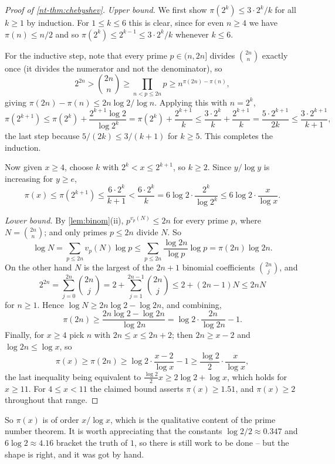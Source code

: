 \documentclass[a4paper]{scrartcl}
\begin{document}
\begin{proof}[Proof of \autoref{nt-thm:chebyshev}]
	\emph{Upper bound.} We first show $\pi(2^k) \leq 3 \cdot 2^k/k$ for all $k \geq 1$ by induction. For $1 \leq k \leq 6$ this is clear, since for even $n \geq 4$ we have $\pi(n) \leq n/2$ and so $\pi(2^k) \leq 2^{k-1} \leq 3\cdot2^k/k$ whenever $k \leq 6$.

	For the inductive step, note that every prime $p \in (n, 2n]$ divides $\binom{2n}n$ exactly once (it divides the numerator and not the denominator), so
	$$
	2^{2n} > \binom{2n}n \geq \prod_{n < p \leq 2n}p \geq n^{\pi(2n) - \pi(n)},
	$$
	giving $\pi(2n) - \pi(n) \leq 2n\log 2/\log n$. Applying this with $n = 2^k$,
	$$
	\pi(2^{k+1}) \leq \pi(2^k) + \frac{2^{k+1}\log 2}{\log 2^k} = \pi(2^k) + \frac{2^{k+1}}k \leq \frac{3\cdot2^k}k + \frac{2^{k+1}}k = \frac{5\cdot 2^{k+1}}{2k} \leq \frac{3\cdot2^{k+1}}{k+1},
	$$
	the last step because $5/(2k) \leq 3/(k+1)$ for $k \geq 5$. This completes the induction.

	Now given $x \geq 4$, choose $k$ with $2^k < x \leq 2^{k+1}$, so $k \geq 2$. Since $y/\log y$ is increasing for $y \geq e$,
	$$
	\pi(x) \leq \pi(2^{k+1}) \leq \frac{6 \cdot 2^k}{k+1} < \frac{6\cdot 2^k}{k} = 6\log 2\cdot\frac{2^k}{\log 2^k} \leq 6\log 2\cdot\frac{x}{\log x}.
	$$

	\emph{Lower bound.} By \autoref{lem:binom}(ii), $p^{v_p(N)} \leq 2n$ for every prime $p$, where $N = \binom{2n}n$; and only primes $p \leq 2n$ divide $N$. So
	$$
	\log N = \sum_{p \leq 2n}v_p(N)\log p \leq \sum_{p \leq 2n}\frac{\log 2n}{\log p}\log p = \pi(2n)\log 2n.
	$$
	On the other hand $N$ is the largest of the $2n+1$ binomial coefficients $\binom{2n}j$, and
	$$
	2^{2n} = \sum_{j=0}^{2n}\binom{2n}j = 2 + \sum_{j=1}^{2n-1}\binom{2n}j \leq 2 + (2n-1)N \leq 2nN
	$$
	for $n \geq 1$. Hence $\log N \geq 2n\log 2 - \log 2n$, and combining,
	$$
	\pi(2n) \geq \frac{2n\log 2 - \log 2n}{\log 2n} = \log 2\cdot\frac{2n}{\log 2n} - 1.
	$$
	Finally, for $x \geq 4$ pick $n$ with $2n \leq x \leq 2n+2$; then $2n \geq x - 2$ and $\log 2n \leq \log x$, so
	$$
	\pi(x) \geq \pi(2n) \geq \log 2\cdot\frac{x-2}{\log x} - 1 \geq \frac{\log 2}2\cdot\frac x{\log x},
	$$
	the last inequality being equivalent to $\frac{\log 2}2 x \geq 2\log 2 + \log x$, which holds for $x \geq 11$. For $4 \leq x < 11$ the claimed bound asserts $\pi(x) \geq 1.51$, and $\pi(x) \geq 2$ throughout that range.
\end{proof}

So $\pi(x)$ is of order $x/\log x$, which is the qualitative content of the prime number theorem. It is worth appreciating that the constants $\log 2/2 \approx 0.347$ and $6\log 2 \approx 4.16$ bracket the truth of $1$, so there is still work to be done -- but the shape is right, and it was got by hand.
\end{document}
